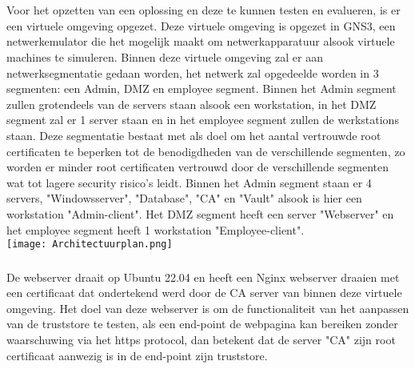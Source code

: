 \chapter{}%
\label{ch:proof-of-concept}
\section{}%
\label{sec:Virtuele_omgeving}

Voor het opzetten van een oplossing en deze te kunnen testen en evalueren, is er een virtuele omgeving opgezet.
Deze virtuele omgeving is opgezet in GNS3, een netwerkemulator die het mogelijk maakt om netwerkapparatuur alsook virtuele machines te simuleren.
Binnen deze virtuele omgeving zal er aan netwerksegmentatie gedaan worden, het netwerk zal opgedeelde worden in 3 segmenten: een Admin, DMZ en employee segment.
Binnen het Admin segment zullen grotendeels van de servers staan alsook een workstation, in het DMZ segment zal er 1 server staan en in het employee segment zullen de werkstations staan.
Deze segmentatie bestaat met als doel om het aantal vertrouwde root certificaten te beperken tot de benodigdheden van de verschillende segmenten, zo worden er minder root certificaten vertrouwd door de verschillende segmenten wat tot lagere security risico's leidt.
Binnen het Admin segment staan er 4 servers, "Windowsserver", "Database", "CA" en "Vault" alsook is hier een workstation "Admin-client". Het DMZ segment heeft een server "Webserver" en het employee segment heeft 1 workstation "Employee-client". \\

\texttt{[image: Architectuurplan.png]}

\subsection{}
\label{subsec:Webserver}

De webserver draait op Ubuntu 22.04 en heeft een Nginx webserver draaien met een certificaat dat ondertekend werd door de CA server van binnen deze virtuele omgeving.
Het doel van deze webserver is om de functionaliteit van het aanpassen van de truststore te testen, als een end-point de webpagina kan bereiken zonder waarschuwing via het https protocol, dan betekent dat de server "CA" zijn root certificaat aanwezig is in de end-point zijn truststore.

